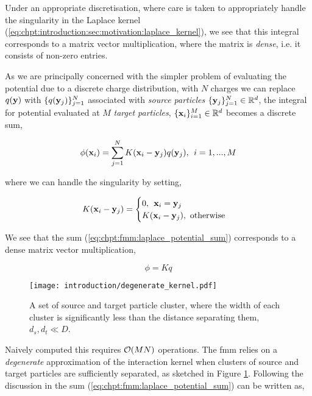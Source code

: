 Under an appropriate discretisation, where care is taken to appropriately handle the singularity in the Laplace kernel (\ref{eq:chpt:introduction:sec:motivation:laplace_kernel}), we see that this integral corresponds to a matrix vector multiplication, where the matrix is \textit{dense}, i.e. it consists of non-zero entries.

As we are principally concerned with the simpler problem of evaluating the potential due to a discrete charge distribution, with $N$ charges we can replace $q(\mathbf{y})$ with $\{ q(\mathbf{y}_j) \}_{j=1}^N$ associated with \textit{source particles} $\{\mathbf{y}_j\}_{j=1}^N \in \mathbb{R}^d$, the integral for potential evaluated at $M$ \textit{target particles}, $\{\mathbf{x}_i \}_{i=1}^M \in \mathbb{R}^d$ becomes a discrete sum,

\begin{equation}
    \phi(\mathbf{x}_i) = \sum_{j=1}^N K(\mathbf{x}_i-\mathbf{y}_j)q(\mathbf{y}_j), \> \> i = 1,...,M
    \label{eq:chpt:fmm:laplace_potential_sum}
\end{equation}

where we can handle the singularity by setting,

\begin{equation}
    K(\mathbf{x}_i - \mathbf{y}_j) = \begin{cases}
        0, \> \> \mathbf{x}_i = \mathbf{y}_j \\
        K(\mathbf{x}_i - \mathbf{y}_j), \text{  otherwise}
    \end{cases}
\end{equation}


We see that the sum (\ref{eq:chpt:fmm:laplace_potential_sum}) corresponds to a dense matrix vector multiplication,

\begin{equation}
    \phi = K q
\end{equation}


\begin{figure}
    \centering
    \texttt{[image: introduction/degenerate\_kernel.pdf]}
    \caption{A set of source and target particle cluster, where the width of each cluster is significantly less than the distance separating them, $d_s, d_t \ll D$.}
    \label{fig:chpt:fmm:degenerate_kernel}
\end{figure}

Naively computed this requires $\mathcal{O}(MN)$ operations. The \acrshort{fmm} relies on a \textit{degenerate} approximation of the interaction kernel when clusters of source and target particles are sufficiently separated, as sketched in Figure \ref{fig:chpt:fmm:degenerate_kernel}. Following the discussion in \cite{kailasa2024m2ltranslationoperatorskernel} the sum (\ref{eq:chpt:fmm:laplace_potential_sum}) can be written as,

